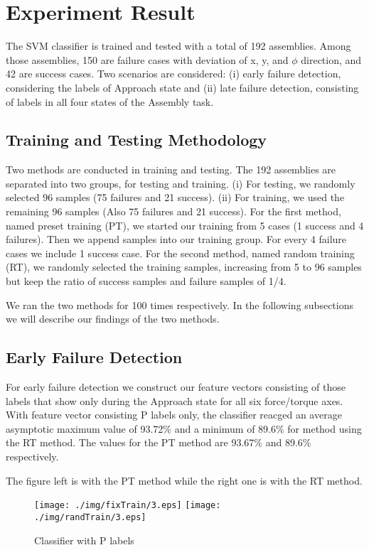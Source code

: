 \chapter{Experiment Result}
The SVM classifier is trained and tested with a total of 192 assemblies. Among those assemblies, 150 are failure cases with deviation of x, y, and $\phi$ direction, and 42 are success cases. Two scenarios are considered: (i) early failure detection, considering the labels of Approach state and (ii) late failure detection, consisting of labels in all four states of the Assembly task.

\section{Training and Testing Methodology}
Two methods are conducted in training and testing. The 192 assemblies are separated into two groups, for testing and training. (i) For testing, we randomly selected 96 samples (75 failures and 21 success). (ii) For training, we used the remaining 96 samples (Also 75 failures and 21 success). For the first method, named preset training (PT), we started our training from 5 cases (1 success and 4 failures). Then we append samples into our training group. For every 4 failure cases we include 1 success case. For the second method, named random training (RT), we randomly selected the training samples, increasing from 5 to 96 samples but keep the ratio of success samples and failure samples of 1/4.  

We ran the two methods for 100 times respectively. In the following subsections we will describe our findings of the two methods.
\section{Early Failure Detection}
For early failure detection we construct our feature vectors consisting of those labels that show only during the Approach state for all six force/torque axes. With feature vector consisting P labels only, the classifier reacged an average asymptotic maximum value of 93.72\% and a minimum of 89.6\% for method using the RT method. The values for the PT method are 93.67\% and 89.6\% respectively.

\indent The figure left is with the PT method while the right one is with the RT method.
\begin{figure}[h]
    \centering
    \texttt{[image: ./img/fixTrain/3.eps]}
    \texttt{[image: ./img/randTrain/3.eps]}
    \caption{Classifier with P labels}
    \label{P}
\end{figure}

